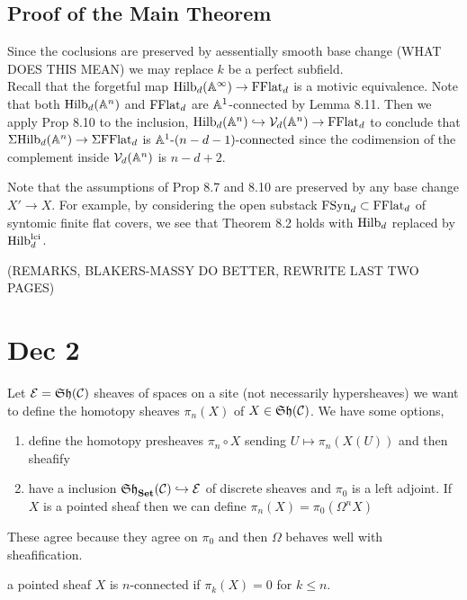 \documentclass[12pt]{article}
\begin{document}
\subsection{Proof of the Main Theorem}

Since the coclusions are preserved by aessentially smooth base change (WHAT DOES THIS MEAN) we may replace $k$ be a perfect subfield. 
\bigskip\\
Recall that the forgetful map $\mathrm{Hilb}_d(\mathbb{A}^{\infty}) \to \mathrm{FFlat}_d$ is a motivic equivalence. Note that both $\mathrm{Hilb}_d(\mathbb{A}^n)$ and $\mathrm{FFlat}_d$ are $\mathbb{A}^1$-connected by Lemma 8.11. Then we apply Prop 8.10 to the inclusion, $\mathrm{Hilb}_d(\mathbb{A}^n) \hookrightarrow \mathcal{V}_d(\mathbb{A}^n) \to \mathrm{FFlat}_d$ to conclude that $\Sigma \mathrm{Hilb}_d(\mathbb{A}^n) \to \Sigma \mathrm{FFlat}_d$ is $\mathbb{A}^1\text{-}(n-d-1)\text{-connected}$ since the codimension of the complement inside $\mathcal{V}_d(\mathbb{A}^n)$ is $n - d + 2$.


\begin{rmk}
Note that the assumptions of Prop 8.7 and 8.10 are preserved by any base change $X' \to X$. For example, by considering the open substack $\mathrm{FSyn}_d \subset \mathrm{FFlat}_d$ of syntomic finite flat covers, we see that Theorem 8.2 holds with $\mathrm{Hilb}_d$ replaced by $\mathrm{Hilb}_d^{\text{lci}}$.
\end{rmk}

(REMARKS, BLAKERS-MASSY DO BETTER, REWRITE LAST TWO PAGES)

\section{Dec 2}


Let $\mathcal{E} = \mathfrak{Sh}(\mathcal{C})$ sheaves of spaces on a site (not necessarily hypersheaves) we want to define the homotopy sheaves $\pi_n(X)$ of $X \in \mathfrak{Sh}(\mathcal{C})$. We have some options,
\begin{enumerate}
\item define the homotopy presheaves $\pi_n \circ X$ sending $U \mapsto \pi_n(X(U))$ and then sheafify
\item have a inclusion $\mathfrak{Sh}_{\mathbf{Set}}(\mathcal{C}) \hookrightarrow \mathcal{E}$ of discrete sheaves and $\pi_0$ is a left adjoint. If $X$ is a pointed sheaf then we can define $\pi_n(X) = \pi_0(\Omega^n X)$
\end{enumerate}

These agree because they agree on $\pi_0$ and then $\Omega$ behaves well with sheafification. 

\begin{defn}
a pointed sheaf $X$ is $n$-connected if $\pi_k(X) = 0$ for $k \le n$.
\end{defn}
\end{document}
